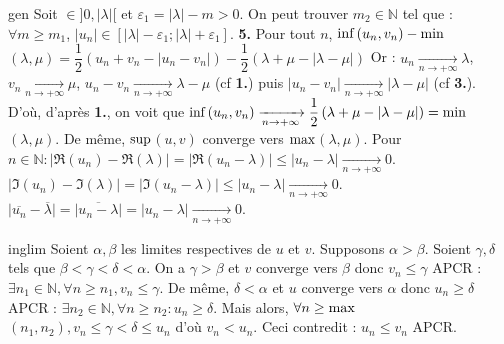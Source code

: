 \documentclass[12pt,a4paper]{report}
\begin{document}
\begin{demonstration}{gen}
\newline Soit $ \in ]0, \lvert \lambda \rvert[$ et $\varepsilon_1 = \lvert \lambda \rvert - m > 0$. On peut trouver $m_2 \in \mathbb{N}$ tel que : $\forall m \geq m_1$, $\lvert u_n \rvert \in \left[ \lvert \lambda \rvert - \varepsilon_1 ; \lvert \lambda \rvert + \varepsilon_1 \right]$.
\newline \newline \textbf{5.} Pour tout $n$, $\rm{inf}$$(u_n,v_n) - \rm{min}$$(\lambda,\mu) = \dfrac{1}{2} \left( u_n + v_n - \lvert u_n - v_n \rvert \right) - \dfrac{1}{2} \left( \lambda + \mu - \lvert \lambda - \mu \rvert \right)$
\newline Or : $u_n \xrightarrow[n \rightarrow + \infty]{} \lambda$, $v_n \xrightarrow[n \rightarrow + \infty]{} \mu$, $u_n-v_n \xrightarrow[n \rightarrow + \infty]{} \lambda-\mu$ (cf \textbf{1.})
\newline puis $\lvert u_n - v_n \rvert \xrightarrow[n \rightarrow + \infty]{} \lvert \lambda - \mu \rvert$ (cf \textbf{3.}). D'où, d'après \textbf{1.}, on voit que $\rm{inf}$$(u_n,v_n) \xrightarrow[n \rightarrow + \infty]{} \dfrac{1}{2} \left( \lambda + \mu - \lvert \lambda - \mu \rvert \right) = \rm{min}$$(\lambda,\mu)$.
\newline De même, $\rm{sup}$$(u,v)$ converge vers $\rm{max}$$(\lambda,\mu)$.
\newline \newline Pour $n \in \mathbb{N} : \lvert \Re(u_n)-\Re(\lambda) \rvert = \lvert \Re(u_n - \lambda) \rvert \leq \lvert u_n - \lambda \rvert \xrightarrow[n \rightarrow + \infty]{} 0$.
\newline $\lvert \Im(u_n)-\Im(\lambda) \rvert = \lvert \Im(u_n - \lambda) \rvert \leq \lvert u_n - \lambda \rvert \xrightarrow[n \rightarrow + \infty]{} 0$.
\newline $\lvert \overline{u_n}-\overline{\lambda} \rvert = \lvert \overline{u_n - \lambda} \rvert = \lvert u_n - \lambda \rvert \xrightarrow[n \rightarrow + \infty]{} 0$.
\end{demonstration}

\begin{demonstration}{inglim}
Soient $\alpha,\beta$ les limites respectives de $u$ et $v$. Supposons $\alpha > \beta$.
\newline Soient $\gamma,\delta$ tels que $\beta < \gamma < \delta < \alpha$. 
\newline On a $\gamma > \beta$ et $v$ converge vers $\beta$ donc $v_n \leq \gamma$ APCR : $\exists n_1 \in \mathbb{N}, \forall n \geq n_1, v_n \leq \gamma$.
\newline De même, $\delta < \alpha$ et $u$ converge vers $\alpha$ donc $u_n \geq \delta$ APCR : $\exists n_2 \in \mathbb{N}, \forall n \geq n_2 : u_n \geq \delta$.
\newline Mais alors, $\forall n \geq \rm{max}$ $(n_1,n_2), v_n \leq \gamma < \delta \leq u_n$ d'où $v_n < u_n$. Ceci contredit : $u_n \leq v_n$ APCR.
\end{demonstration}
\end{document}
